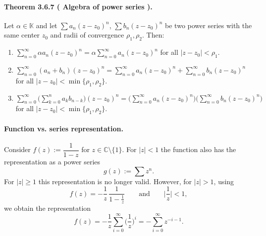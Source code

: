 \documentclass[12pt]{article}
\newcommand{\C}{\mathbb{C}}
\newcommand{\K}{\mathbb{K}} %
\newcommand{\NumberedTheorem}[3]{%
\paragraph*{Theorem #1 ( #2 ).} #3\par}
\begin{document}
\NumberedTheorem{3.6.7}{Algebra of power series}{Let $\alpha\in\K$ and let $\sum a_n (z-z_0)^n$, $\sum b_n (z-z_0)^n$ be two power series with the same center $z_0$ and radii of convergence $\rho_1,\rho_2$. Then:
\begin{enumerate}[label={(\arabic*)}, leftmargin=*]
	\item $\displaystyle \sum_{n=0}^{\infty} \alpha a_n (z-z_0)^n = \alpha \sum_{n=0}^{\infty} a_n (z-z_0)^n$ for all $|z-z_0|<\rho_1$.
	\item $\displaystyle \sum_{n=0}^{\infty} (a_n+b_n)(z-z_0)^n = \sum_{n=0}^{\infty} a_n (z-z_0)^n + \sum_{n=0}^{\infty} b_n (z-z_0)^n$ for all $|z-z_0|<\min\{\rho_1,\rho_2\}$.
	\item $\displaystyle \sum_{n=0}^{\infty} \Big( \sum_{k=0}^{n} a_k b_{n-k} \Big) (z-z_0)^n 
		= \Big( \sum_{n=0}^{\infty} a_n (z-z_0)^n \Big) \Big( \sum_{n=0}^{\infty} b_n (z-z_0)^n \Big)$ for all $|z-z_0|<\min\{\rho_1,\rho_2\}$.
\end{enumerate}}

\paragraph{Function vs. series representation.}
Consider $f(z) := \dfrac{1}{1-z}$ for $z\in\C\setminus\{1\}$. For $|z|<1$ the function also has the representation as a power series
\[
	g(z) := \sum z^{n}.
\]
For $|z|\ge1$ this representation is no longer valid. However, for $|z|>1$, using
\[
	f(z) = -\frac{1}{z}\,\frac{1}{1-\tfrac{1}{z}} \qquad\text{and}\qquad \Big|\frac{1}{z}\Big|<1,
\]
we obtain the representation
\[
	f(z) = -\frac{1}{z}\sum_{i=0}^{\infty} \Big(\frac{1}{z}\Big)^{i} = -\sum_{i=0}^{\infty} z^{-i-1}.
\]
\end{document}
